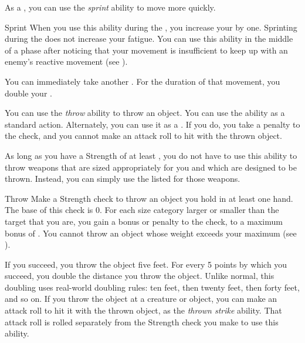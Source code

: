         \label{Sprint} As a , you can use the \textit{sprint} ability to move more quickly.

        \begin{activeability}{Sprint}
            \rankline
            When you use this ability during the , you increase your  by one.
            Sprinting during the  does not increase your fatigue.
            You can use this ability in the middle of a phase after noticing that your movement is insufficient to keep up with an enemy's reactive movement (see ).

            You can immediately take another .
            For the duration of that movement, you double your .
        \end{activeability}

        \label{Throw} You can use the \textit{throw} ability to throw an object.
        You can use the ability as a standard action.
        Alternately, you can use it as a .
        If you do, you take a  penalty to the check, and you cannot make an attack roll to hit with the thrown object.

        As long as you have a Strength of at least , you do not have to use this ability to throw weapons that are sized appropriately for you and which are designed to be thrown.
        Instead, you can simply use the listed  for those weapons.

        \begin{activeability}{Throw}
            \rankline
            Make a Strength check to throw an object you hold in at least one hand.
            The base  of this check is 0.
            For each size category larger or smaller than the target that you are, you gain a  bonus or penalty to the check, to a maximum bonus of .
            You cannot throw an object whose weight exceeds your maximum  (see ).

            If you succeed, you throw the object five feet.
            For every 5 points by which you succeed, you double the distance you throw the object.
            Unlike normal, this doubling uses real-world doubling rules: ten feet, then twenty feet, then forty feet, and so on.
            If you throw the object at a creature or object, you can make an attack roll to hit it with the thrown object, as the \textit{thrown strike} ability.
            That attack roll is rolled separately from the Strength check you make to use this ability.
        \end{activeability}

